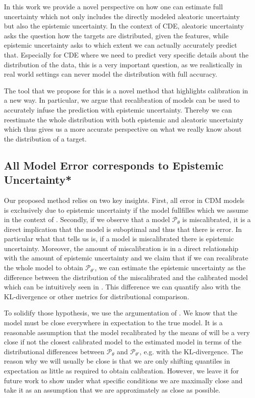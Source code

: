 In this work we provide a novel perspective on how one can estimate full uncertainty which not only includes the directly modeled aleatoric uncertainty but also the epistemic uncertainty. In the context of CDE, aleatoric uncertainty asks the question how the targets are distributed, given the features, while epistemic uncertainty asks to which extent we can actually accurately predict that. Especially for CDE where we need to predict very specific details about the distribution of the data, this is a very important question, as we realistically in real world settings can never model the distribution with full accuracy.

The tool that we propose for this is a novel method that highlights calibration in a new way. In particular, we argue that recalibration of models can be used to accurately infuse the prediction with epistemic uncertainty. Thereby we can reestimate the whole distribution with both epistemic and aleatoric uncertainty which thus gives us a more accurate perspective on what we really know about the distribution of a target.

\subsection{All Model Error corresponds to Epistemic Uncertainty*}\label{sec:uncertainty_calibration_connection}

Our proposed method relies on two key insights. First, all error in CDM models is exclusively due to epistemic uncertainty if the model fullfilles  which we assume in the context of . Secondly, if we observe that a model $\mathscr{P}_\theta$ is miscalibrated, it is a direct implication that the model is suboptimal and thus that there is error. In particular what that tells us is, if a model is miscalibrated there is epistemic uncertainty. Moreover, the amount of miscalibration is in a direct relationship with the amount of epistemic uncertainty and we claim that if we can recalibrate the whole model to obtain $\mathscr{P}_{\theta'}$, we can estimate the epistemic uncertainty as the difference between the distribution of the miscalibrated and the calibrated model which can be intuitively seen in . This difference we can quantify also with the KL-divergence or other metrics for distributional comparison.

To solidify those hypothesis, we use the argumentation of . We know that the model must be close everywhere in expectation to the true model. It is a reasonable assumption that the model recalibrated by the means of  will be a very close if not the closest calibrated model to the estimated model in terms of the distributional differences between $\mathscr{P}_\theta$ and $\mathscr{P}_{\theta'}$, e.g. with the KL-divergence. The reason why we will usually be close is that we are only shifting quantiles in expectation as little as required to obtain calibration. However, we leave it for future work to show under what specific conditions we are maximally close and take it as an assumption that we are approximately as close as possible.

